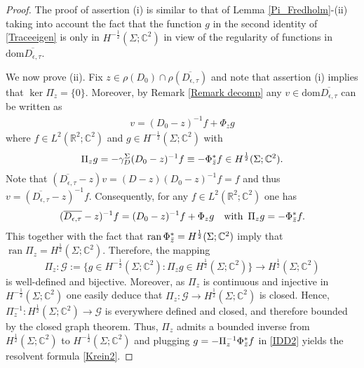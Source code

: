\documentclass[11pt,a4paper,reqno,oneside]{amsproc}
\DeclareMathOperator{\dom}{dom}
\DeclareMathOperator{\ran}{ran}
\def \rr {{\mathbb R}}
\def \cc {{\mathbb C}}
\numberwithin{equation}{section}
\def\dom{\mathrm{dom}}
\def \cc {{\mathbb{C}}}
\begin{document}
\begin{proof} The proof of assertion (i) is similar to that of Lemma \ref{Pi_Fredholm}-(ii) taking into account the fact that the function $g$ in the second identity of \eqref{Traceeigen} is only in $H^{-\frac{1}{2}}(\Sigma;\cc^2)$ in view of the regularity of functions in $\dom \overline{D_{\epsilon,\tau}}$.

 We now prove (ii). Fix $z\in\rho(D_0)\cap\rho(\overline{D_{\epsilon,\tau}})$ and note that  assertion (i) implies that $\ker \Pi_z=\{0\}$. Moreover, by Remark  \ref{Remark decomp}  any $v\in \dom \overline{D_{\epsilon,\tau}}$ can be written as 
 \begin{align*}%
 v= (D_0-z)^{-1}f +\Phi_z g
 \end{align*}
  where $f\in L^2(\rr^2;\cc^2)$ and $g\in H^{-\frac{1}{2}}(\Sigma;\cc^2)$ with 
 \begin{align*}%
\Pi_z g= - \gamma_D^\Sigma  (D_0-z)^{-1}f\equiv -\Phi_{\Bar z}^\ast f \in H^{\frac{1}{2}}(\Sigma;\cc^2).
 \end{align*}
 Note that $(\overline{D_{\epsilon,\tau}}-z) v= (D-z)(D_0-z)^{-1}f=f$ and thus $v=(\overline{D_{\epsilon,\tau}}-z)^{-1}f$.  Consequently, for any $f\in L^2(\rr^2;\cc^2)$ one has 
  \begin{align}\label{IDD2}
 (\overline{D_{\epsilon,\tau}}-z)^{-1}f= (D_0-z)^{-1}f +\Phi_z g \quad \text{with }\,  \Pi_z g=  -\Phi_{\Bar z}^\ast f.
 \end{align}
 This together with the fact that $\ran  \Phi_{\Bar z}^\ast= H^{\frac{1}{2}}(\Sigma;\cc^2)$ imply that $\ran \Pi_z= H^{\frac{1}{2}}(\Sigma;\cc^2)$. Therefore, the mapping 
 \[
 \Pi_z:  \mathcal G:=\{ g\in H^{-\frac{1}{2}}(\Sigma;\cc^2): \Pi_z g\in H^{\frac{1}{2}}(\Sigma;\cc^2)\} \longrightarrow  H^{\frac{1}{2}}(\Sigma;\cc^2)
 \]
 is well-defined and bijective. Moreover, as $\Pi_z$ is continuous and injective in $H^{-\frac{1}{2}}(\Sigma;\cc^2)$ one easily deduce that $\Pi_z:  \mathcal G \longrightarrow  H^{\frac{1}{2}}(\Sigma;\cc^2)$ is closed. Hence, $\Pi_z^{-1}: H^{\frac{1}{2}}(\Sigma;\cc^2) \longrightarrow \mathcal G $ is everywhere defined and closed, and therefore bounded by the closed graph theorem. Thus, $\Pi_z$ admits a bounded inverse from $H^{\frac{1}{2}}(\Sigma;\cc^2)$ to $H^{-\frac{1}{2}}(\Sigma;\cc^2)$ and plugging $g= - \Pi_z^{-1}\Phi_{\Bar z}^\ast f$ in \eqref{IDD2} yields the resolvent formula \eqref{Krein2}.
 

\end{proof}
\end{document}
